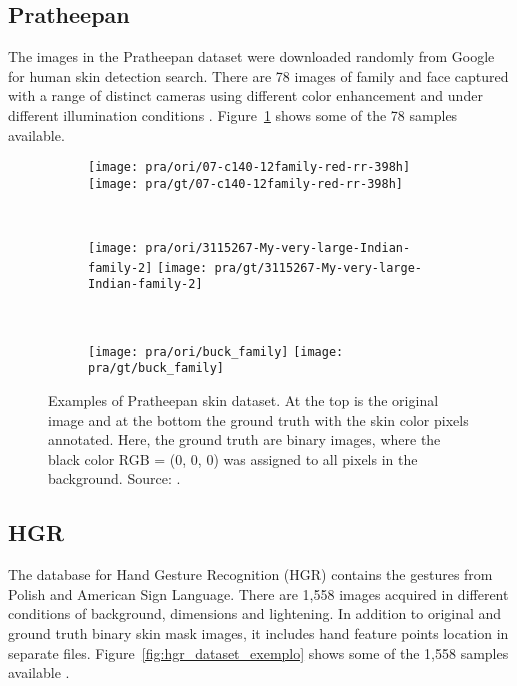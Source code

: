 \subsection{Pratheepan}
\label{sec:datasets_pratheepan}
The images in the Pratheepan dataset were downloaded randomly from Google for human skin detection search. There are 78 images of family and face captured with a range of distinct cameras using different color enhancement and under different illumination conditions \cite{tan:12}. Figure~\ref{fig:pra_dataset_exemplo} shows some of the 78 samples available.

\begin{figure}[hb]
    \centering
    \begin{subfigure}[t]{0.293\textwidth}
        \texttt{[image: pra/ori/07-c140-12family-red-rr-398h]}
        \texttt{[image: pra/gt/07-c140-12family-red-rr-398h]}
    \end{subfigure}
    ~
    \begin{subfigure}[t]{0.31\textwidth}
        \texttt{[image: pra/ori/3115267-My-very-large-Indian-family-2]}
        \texttt{[image: pra/gt/3115267-My-very-large-Indian-family-2]}
    \end{subfigure}
    ~
    \begin{subfigure}[t]{0.31\textwidth}
        \texttt{[image: pra/ori/buck\_family]}
        \texttt{[image: pra/gt/buck\_family]}
    \end{subfigure}
    \caption[Examples of Pratheepan skin dataset]{Examples of Pratheepan skin dataset. At the top is the original image and at the bottom the ground truth with the skin color pixels annotated. Here, the ground truth are binary images, where the black color RGB = (0, 0, 0) was assigned to all pixels in the background. Source: \citet{tan:12}.}
    \label{fig:pra_dataset_exemplo}
\end{figure}


\subsection{HGR}
\label{sec:datasets_hgr}
The database for Hand Gesture Recognition (HGR) contains the gestures from Polish and American Sign Language. There are 1,558 images acquired in different conditions of background, dimensions and lightening. In addition to original and ground truth binary skin mask images, it includes hand feature points location in separate files. Figure~\ref{fig:hgr_dataset_exemplo} shows some of the 1,558 samples available \citep{kawulok:14, nalepa:14, grzejszczak:16}.


